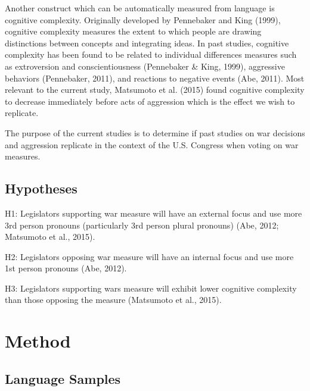 \documentclass[english,,man,floatsintext]{apa6}
\begin{document}
Another construct which can be automatically measured from language is cognitive complexity. Originally developed by Pennebaker and King (1999), cognitive complexity measures the extent to which people are drawing distinctions between concepts and integrating ideas. In past studies, cognitive complexity has been found to be related to individual differences measures such as extroversion and conscientiousness (Pennebaker \& King, 1999), aggressive behaviors (Pennebaker, 2011), and reactions to negative events (Abe, 2011). Most relevant to the current study, Matsumoto et al. (2015) found cognitive complexity to decrease immediately before acts of aggression which is the effect we wish to replicate.

The purpose of the current studies is to determine if past studies on war decisions and aggression replicate in the context of the U.S. Congress when voting on war measures.

\hypertarget{hypotheses}{%
\subsection{Hypotheses}\label{hypotheses}}

H1: Legislators supporting war measure will have an external focus and use more 3rd person pronouns (particularly 3rd person plural pronouns) (Abe, 2012; Matsumoto et al., 2015).

H2: Legislators opposing war measure will have an internal focus and use more 1st person pronouns (Abe, 2012).

H3: Legislators supporting wars measure will exhibit lower cognitive complexity than those opposing the measure (Matsumoto et al., 2015).

\hypertarget{method}{%
\section{Method}\label{method}}

\hypertarget{language-samples}{%
\subsection{Language Samples}\label{language-samples}}
\end{document}
